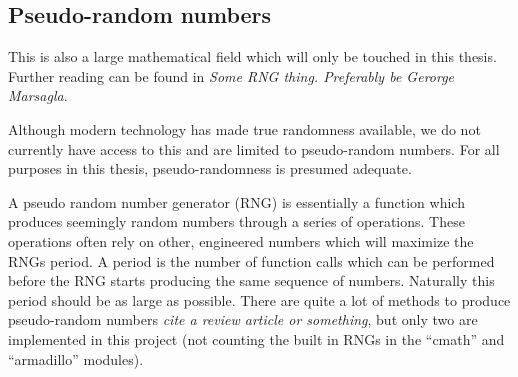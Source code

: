 % 

\subsection{Pseudo-random numbers}

This is also a large mathematical field which will only be touched in this thesis. 
Further reading can be found in \emph{Some RNG thing. Preferably be Gerorge Marsagla}. 

Although modern technology has made true randomness available, we do not currently have access to this and are limited to pseudo-random numbers. 
For all purposes in this thesis, pseudo-randomness is presumed adequate. 

A pseudo random number generator (RNG) is essentially a function which produces seemingly random numbers through a series of operations. 
These operations often rely on other, engineered numbers which will maximize the RNGs period. 
A period is the number of function calls which can be performed before the RNG starts producing the same sequence of numbers. 
Naturally this period should be as large as possible. 
There are quite a lot of methods to produce pseudo-random numbers \emph{cite a review article or something}, but only two are implemented in this project (not counting the built in RNGs in the ``cmath'' and ``armadillo'' modules). 

